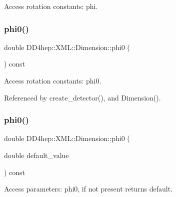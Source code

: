 Access rotation constants\+: phi. 

\hypertarget{struct_d_d4hep_1_1_x_m_l_1_1_dimension_a94f376b5c43b1260665560d293205a36}{}\label{struct_d_d4hep_1_1_x_m_l_1_1_dimension_a94f376b5c43b1260665560d293205a36} 
\subsubsection{\texorpdfstring{phi0()}{phi0()}\hspace{0.1cm}{\footnotesize\ttfamily [1/2]}}
{\footnotesize\ttfamily double D\+D4hep\+::\+X\+M\+L\+::\+Dimension\+::phi0 (\begin{DoxyParamCaption}{ }\end{DoxyParamCaption}) const}



Access rotation constants\+: phi0. 



Referenced by create\+\_\+detector(), and Dimension().

\hypertarget{struct_d_d4hep_1_1_x_m_l_1_1_dimension_a5533d96a01cca0ca36425ddcd92b9ba1}{}\label{struct_d_d4hep_1_1_x_m_l_1_1_dimension_a5533d96a01cca0ca36425ddcd92b9ba1} 
\subsubsection{\texorpdfstring{phi0()}{phi0()}\hspace{0.1cm}{\footnotesize\ttfamily [2/2]}}
{\footnotesize\ttfamily double D\+D4hep\+::\+X\+M\+L\+::\+Dimension\+::phi0 (\begin{DoxyParamCaption}\item[{double}]{default\+\_\+value }\end{DoxyParamCaption}) const}



Access parameters\+: phi0, if not present returns default. 

\hypertarget{struct_d_d4hep_1_1_x_m_l_1_1_dimension_a77abf5ceffbbed79a099356379a2e5d1}{}\label{struct_d_d4hep_1_1_x_m_l_1_1_dimension_a77abf5ceffbbed79a099356379a2e5d1} 
